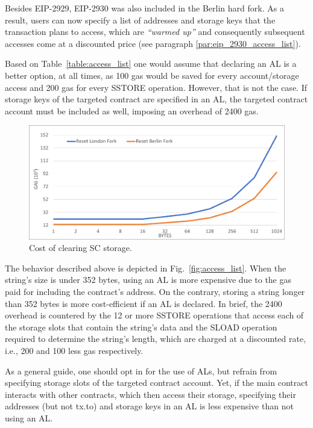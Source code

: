 Besides EIP-2929, EIP-2930 was also included in the Berlin hard fork. As a result, users can now specify a list of addresses and storage keys that the transaction plans to access, which are \emph{``warmed up''} and consequently subsequent accesses come at a discounted price (see paragraph \ref{par:eip_2930_access_list}).

Based on Table~\ref{table:access_list} one would assume that declaring an AL is a better option, at all times, as 100 gas would be saved for every account/storage access and 200 gas for every SSTORE operation. However, that is not the case. If storage keys of the targeted contract are specified in an AL, the targeted contract account must be included as well, imposing an overhead of 2400 gas.

\begin{figure}[htbp]
\centerline{\includegraphics[width=\textwidth]{figs/reset.pdf}}
\caption{Cost of clearing SC storage.}
\label{fig:reset}
\end{figure}

The behavior described above is depicted in Fig.~\ref{fig:access_list}. When the string’s size is under 352 bytes, using an AL is more expensive due to the gas paid for including the contract’s address. On the contrary, storing a string longer than 352 bytes is more cost-efficient if an AL is declared. In brief, the 2400 overhead is countered by the 12 or more SSTORE operations that access each of the storage slots that contain the string's data and the SLOAD operation required to determine the string's length, which are charged at a discounted rate, i.e., 200 and 100 less gas respectively.

As a general guide, one should opt in for the use of ALs, but refrain from specifying storage slots of the targeted contract account. Yet, if the main contract interacts with other contracts, which then access their storage, specifying their addresses (but not tx.to) and storage keys in an AL is less expensive than not using an AL.

